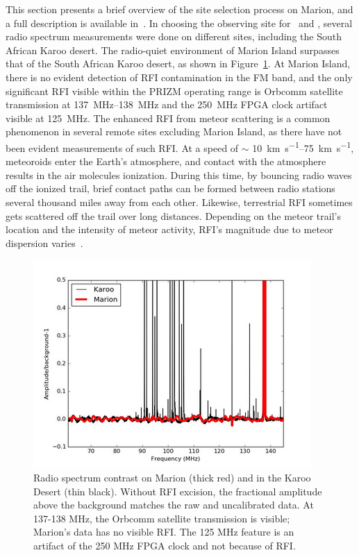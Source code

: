 This section presents a brief overview of the site selection process on Marion, and a full description is available in~\citet{2019JAI.....850004P}. In choosing the observing site for \prizm\ and \albatros, several radio spectrum measurements were done on different sites, including the South African Karoo desert. The radio-quiet environment of Marion Island surpasses that of the South African Karoo desert, as shown in Figure~\ref{fig:karoo}. At Marion Island, there is no evident detection of RFI contamination in the FM band, and the only significant RFI visible within the PRIZM operating range is Orbcomm satellite transmission at \SIrange{137}{138}{\mega\hertz} and the \SI{250}{\mega\hertz} FPGA clock artifact visible at \SI{125}{\mega\hertz}. The enhanced RFI from meteor scattering is a common phenomenon in several remote sites excluding Marion Island, as there have not been evident measurements of such RFI. At a speed of $\sim$ \SIrange{10}{75}{\kilo \meter \per \second}, meteoroids enter the Earth's atmosphere, and contact with the atmosphere results in the air molecules ionization. During this time, by bouncing radio waves off the ionized trail, brief contact paths can be formed between radio stations several thousand miles away from each other. Likewise, terrestrial RFI sometimes gets scattered off the trail over long distances. Depending on the meteor trail's location and the intensity of meteor activity, RFI's magnitude due to meteor dispersion varies~\citep{1996pimo.conf...99W}.

\begin{figure}
	\centering
	\includegraphics[width=\linewidth]{Figures/karoo}
	\caption{Radio spectrum contrast on Marion (thick red) and in the Karoo Desert (thin black). Without RFI excision, the fractional amplitude above the background matches the raw and uncalibrated data. At 137-138 MHz, the Orbcomm satellite transmission is visible; Marion's data has no visible RFI. The 125 MHz feature is an artifact of the 250 MHz FPGA clock and not because of RFI.~\citep{2019JAI.....850004P}}
	\label{fig:karoo}
\end{figure}

